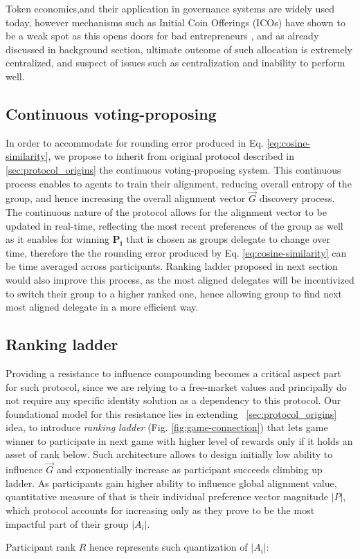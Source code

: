 \documentclass{article}
\begin{document}
\begin{CJK}{UTF8}{gbsn}
\begin{multicols}{2}
        Token economics,and their application in governance systems are widely used today, however mechanisms such as Initial Coin Offerings (ICOs) have shown to be a weak spot as this opens doors for bad entrepreneurs \cite{Johannes24}, and as already discussed in background section, ultimate outcome of such allocation is extremely centralized, and suspect of issues such as centralization and inability to perform well.

        \subsection{Continuous voting-proposing}
        In order to accommodate for rounding error produced in Eq. \ref{eq:cosine-similarity}, we propose to inherit from original protocol described in \ref{sec:protocol_origins} the continuous voting-proposing system. This continuous process enables to agents to train their alignment, reducing overall entropy of the group, and hence increasing the overall alignment vector $\vec{G}$ discovery process. The continuous nature of the protocol allows for the alignment vector to be updated in real-time, reflecting the most recent preferences of the group as well as it enables for winning $\mathbf{P_i}$ that is chosen as groups delegate to change over time, therefore the the rounding error produced by Eq. \ref{eq:cosine-similarity} can be time averaged across participants. Ranking ladder proposed in next section would also improve this process, as the most aligned delegates will be incentivized to switch their group to a higher ranked one, hence allowing group to find next most aligned delegate in a more efficient way.

        \subsection{Ranking ladder}

        Providing a resistance to influence compounding becomes a critical aspect part for such protocol, since we are relying to a free-market values and principally do not require any specific identity solution as a dependency to this protocol.
        Our foundational model for this resistance lies in extending  ~\ref{sec:protocol_origins} idea, to introduce \textit{ranking ladder} (Fig. \ref*{fig:game-connection}) that lets game winner to participate in next game with higher level of rewards only if it holds an asset of rank below. Such architecture allows to design initially low ability to influence ${\vec{G}}$ and exponentially increase as participant succeeds climbing up ladder. As participants gain higher ability to influence global alignment value, quantitative measure of that is their individual preference vector magnitude $|P|$, which protocol accounts for increasing only as they prove to be the most impactful part of their group $|A_i|$.
        
        Participant rank $R$ hence represents such quantization of $|A_i|$:


\end{multicols}
\end{CJK}
\end{document}
